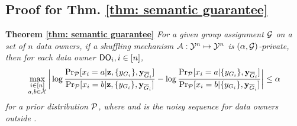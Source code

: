 \subsection{Proof for Thm. \ref{thm: semantic guarantee}}\label{app:thm:semantic}
\label{app:bayesian proof} 
\textbf{Theorem \ref{thm: semantic guarantee}} 
\emph{
For a given group assignment $\mathcal{G}$ on a set of $n$ data owners, if a shuffling mechanism $\mathcal{A}:\mathcal{Y}^n\mapsto \mathcal{Y}^n$ is $(\alpha,\mathcal{G})$-\name private, then for each data owner $\textsf{DO}_i, i \in [n]$, %
\begin{align*}
   \max_{\substack{i\in [n]\\ a,b \in \calX}} \bigg|\log \frac{\Pr_\calP [x_i = a | \bz, \{y_{G_i}\},\by_{\overline{G}_i}]}{\Pr_\calP [x_i = b | \bz, \{y_{G_i}\},\by_{\overline{G}_i}]} - \log \frac{\Pr_\calP [x_i = a | \{y_{G_i}\},\by_{\overline{G}_i}]}{\Pr_\calP [x_i = b | \{y_{G_i}\},\by_{\overline{G}_i}]} \bigg| \leq \alpha  %
\end{align*}
for a prior distribution $\mathcal{P}$, where \scalebox{0.9}{$\bz=\calA(\by)$} and  is the noisy sequence for data owners outside \scalebox{0.9}{$G_i$}.
}
